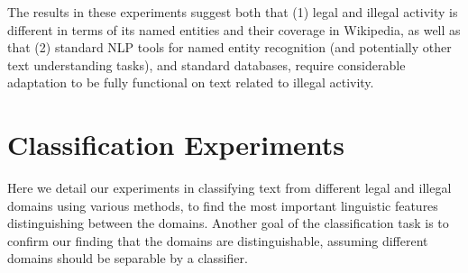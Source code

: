 \documentclass[11pt,a4paper,table]{article}
\begin{document}
 The results in these experiments suggest both that (1) legal and illegal activity is different in terms of its named entities and their coverage in Wikipedia, as well as that (2) standard NLP tools for named entity recognition (and potentially other text understanding tasks), and standard databases, require considerable adaptation to be fully functional on text related to illegal activity. 

% 
% 

\section{Classification Experiments} \label{sec:classification}

Here we detail our experiments in classifying text from different legal and
illegal domains using various methods, to find the most important linguistic features
distinguishing between the domains. Another goal of the classification task is to confirm our finding that the domains are distinguishable, assuming different domains should be separable by a classifier.
\end{document}
